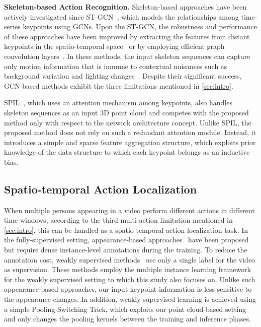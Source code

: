 \documentclass[10pt,twocolumn,letterpaper]{article}
\begin{document}
\noindent \textbf{Skeleton-based Action Recognition.}
Skeleton-based approaches have been actively investigated since ST-GCN~\cite{Sijie2018AAAI}, which models the relationships among time-series keypoints using GCNs.
Upon the ST-GCN, the robustness and performance of these approaches have been improved by extracting the features from distant keypoints in the spatio-temporal space~\cite{Li2019CVPR,Liu2020CVPR,Chen2021ACMMM,Chen2021AAAI} or by employing efficient graph convolution layers~\cite{Zhang2020CVPR,Cai2021WACV}.
In these methods, the input skeleton sequences can capture only motion information that is immune to contextual nuisances such as background variation and lighting changes~\cite{Choi2019Neurips,Weinzaepfel2021IJCV,Moon2021CVPR}.
Despite their significant success, GCN-based methods exhibit the three limitations mentioned in \cref{sec:intro}.

SPIL~\cite{Su2020ECCV}, which uses an attention mechanism among keypoints, also handles skeleton sequences as an input 3D point cloud and competes with the proposed method only with respect to the network architecture concept.
Unlike SPIL, the proposed method does not rely on such a redundant attention module.
Instead, it introduces a simple and sparse feature aggregation structure, which exploits prior knowledge of the data structure to which each keypoint belongs as an inductive bias.

\subsection{Spatio-temporal Action Localization}
When multiple persons appearing in a video perform different actions in different time windows, according to the third multi-action limitation mentioned in \cref{sec:intro}, this can be handled as a spatio-temporal action localization task.
In the fully-supervised setting, appearance-based approaches~\cite{Yixuan2020ECCV,Pan2021CVPR,Kumar2022CVPR} have been proposed but require dense instance-level annotations during the training.
To reduce the annotation cost, weakly supervised methods~\cite{Cheron2018Neurips,Victor2020CVIU,Anurag2020ECCV} use only a single label for the video as supervision. 
These methods employ the multiple instance learning framework~\cite{Thomas1997AI} for the weakly supervised setting to which this study also focuses on.
Unlike such appearance-based approaches, our input keypoint information is less sensitive to the appearance changes.
In addition, weakly supervised learning is achieved using a simple Pooling-Switching Trick, which exploits our point cloud-based setting and only changes the pooling kernels between the training and inference phases.
\end{document}
